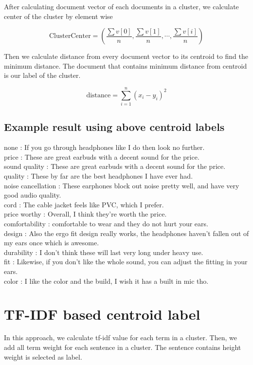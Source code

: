 \documentclass[a4paper]{article}
\begin{document}
After calculating document vector of each documents in a cluster, we calculate center of the cluster by element wise

$$\text{ClusterCenter} = (\frac{\sum v[0]}{n}, \frac{\sum v[1]}{n}, \cdots, \frac{\sum v[i]}{n})$$

Then we calculate distance from every document vector to its centroid to find the minimum distance. The document that contains minimum distance from centroid is our label of the cluster.

$$\text{distance} = \sum_{i=1}^{n} (x_i-y_i)^2 $$

\subsection{Example result using above centroid labels}

none : If you go through headphones like I do then look no further.\\
price : These are great earbuds with a decent sound for the price.\\
sound quality : These are great earbuds with a decent sound for the price.\\
quality : These by far are the best headphones I have ever had.\\
noise cancellation : These earphones block out noise pretty well, and have very good audio quality.\\
cord : The cable jacket feels like PVC, which I prefer.\\
price worthy : Overall, I think they're worth the price.\\
comfortability : comfortable to wear and they do not hurt your ears.\\
design : Also the ergo fit design really works, the headphones haven't fallen out of my ears once which is awesome.\\
durability : I don't think these will last very long under heavy use.\\
fit : Likewise, if you don't like the whole sound, you can adjust the fitting in your ears.\\
color : I like the color and the build, I wish it has a built in mic tho.\\

\section{TF-IDF based centroid label}

In this approach, we calculate tf-idf value for each term in a cluster. Then, we add all term weight for each sentence in a cluster. The sentence contains height weight is selected as label.
\end{document}
